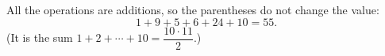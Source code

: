 All the operations are additions, so the parentheses do not change the value:
\[1+9+5+6+24+10=\boxed{55}.\]
(It is the sum $1+2+\cdots+10=\dfrac{10\cdot11}{2}$.)
